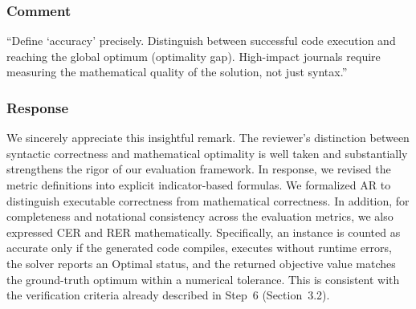 \documentclass[11pt,a4paper]{article}
\begin{document}
\subsubsection{Comment}
``Define `accuracy' precisely. Distinguish between successful code execution and reaching the global optimum (optimality gap). High-impact journals require measuring the mathematical quality of the solution, not just syntax.''

\subsubsection{Response}
We sincerely appreciate this insightful remark. The reviewer's distinction between syntactic correctness and mathematical optimality is well taken and substantially strengthens the rigor of our evaluation framework. In response, we revised the metric definitions into explicit indicator-based formulas. We formalized AR to distinguish executable correctness from mathematical correctness. In addition, for completeness and notational consistency across the evaluation metrics, we also expressed CER and RER mathematically. Specifically, an instance is counted as accurate only if the generated code compiles, executes without runtime errors, the solver reports an Optimal status, and the returned objective value matches the ground-truth optimum within a numerical tolerance. This is consistent with the verification criteria already described in Step~6 (Section~3.2).
\end{document}
